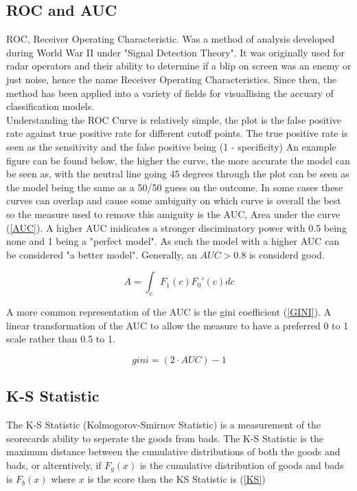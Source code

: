 \subsection{ROC and AUC}
ROC, Receiver Operating Characteristic. Was a method of analysis developed during World War II under "Signal Detection Theory". It was originally used for radar operators and their ability to determine if a blip on screen was an enemy or just noise, hence the name Receiver Operating Characteristics.\cite{tape2000using} Since then, the method has been applied into a variety of fields for visuallising the accuary of classification models. \\

Understanding the ROC Curve is relatively simple, the plot is the false positive rate against true positive rate for different cutoff points. The true positive rate is seen as the sensitivity and the false positive being (1 - specificity) An example figure can be found below, the higher the curve, the more accurate the model can be seen as, with the neutral line going 45 degrees through the plot can be seen as the model being the same as a 50/50 guess on the outcome. In some cases these curves can overlap and cause some ambiguity on which curve is overall the best so the measure used to remove this amiguity is the AUC, Area under the curve (\ref{AUC}). A higher AUC inidicates a stronger disciminatory power with 0.5 being none and 1 being a "perfect model". As such the model with a higher AUC can be considered "a better model". Generally, an $AUC > 0.8$ is considerd good.

\begin{equation}\label{AUC}
A = \int_{c}^{} F_1(c){F_0}'(c) dc
\end{equation}

A more common representation of the AUC is the gini coefficient (\ref{GINI}). A linear transformation of the AUC to allow the measure to have a preferred 0 to 1 scale rather than 0.5 to 1.

\begin{equation}\label{GINI}
gini = (2 \cdot AUC) - 1
\end{equation}

\subsection{K-S Statistic}

The K-S Statistic (Kolmogorov-Smirnov Statistic) is a measurement of the scorecards ability to seperate the goods from bads. The K-S Statistic is the maximum distance between the cumulative distributions of both the goods and bads, or alterntively, if $F_{g}(x)$ is the cumulative distribution of goods and bads is $F_{b}(x)$ where $x$ is the score then the KS Statistic is (\ref{KS})

